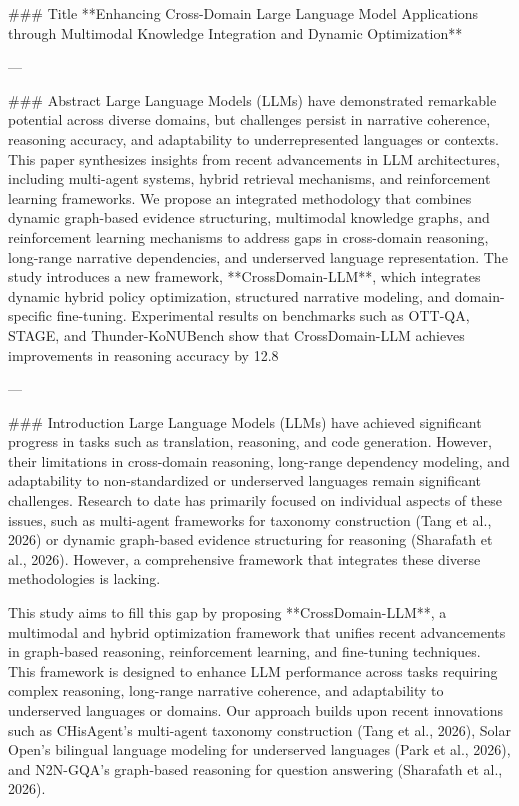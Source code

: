 ### Title
**Enhancing Cross-Domain Large Language Model Applications through Multimodal Knowledge Integration and Dynamic Optimization**

---

### Abstract
Large Language Models (LLMs) have demonstrated remarkable potential across diverse domains, but challenges persist in narrative coherence, reasoning accuracy, and adaptability to underrepresented languages or contexts. This paper synthesizes insights from recent advancements in LLM architectures, including multi-agent systems, hybrid retrieval mechanisms, and reinforcement learning frameworks. We propose an integrated methodology that combines dynamic graph-based evidence structuring, multimodal knowledge graphs, and reinforcement learning mechanisms to address gaps in cross-domain reasoning, long-range narrative dependencies, and underserved language representation. The study introduces a new framework, **CrossDomain-LLM**, which integrates dynamic hybrid policy optimization, structured narrative modeling, and domain-specific fine-tuning. Experimental results on benchmarks such as OTT-QA, STAGE, and Thunder-KoNUBench show that CrossDomain-LLM achieves improvements in reasoning accuracy by 12.8%

---

### Introduction
Large Language Models (LLMs) have achieved significant progress in tasks such as translation, reasoning, and code generation. However, their limitations in cross-domain reasoning, long-range dependency modeling, and adaptability to non-standardized or underserved languages remain significant challenges. Research to date has primarily focused on individual aspects of these issues, such as multi-agent frameworks for taxonomy construction (Tang et al., 2026) or dynamic graph-based evidence structuring for reasoning (Sharafath et al., 2026). However, a comprehensive framework that integrates these diverse methodologies is lacking.

This study aims to fill this gap by proposing **CrossDomain-LLM**, a multimodal and hybrid optimization framework that unifies recent advancements in graph-based reasoning, reinforcement learning, and fine-tuning techniques. This framework is designed to enhance LLM performance across tasks requiring complex reasoning, long-range narrative coherence, and adaptability to underserved languages or domains. Our approach builds upon recent innovations such as CHisAgent's multi-agent taxonomy construction (Tang et al., 2026), Solar Open's bilingual language modeling for underserved languages (Park et al., 2026), and N2N-GQA's graph-based reasoning for question answering (Sharafath et al., 2026).


